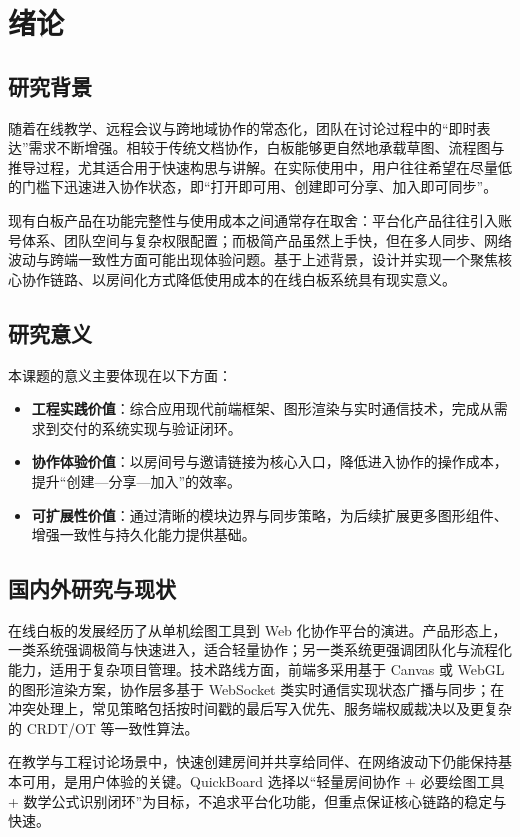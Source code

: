 \chapter{绪论}\label{chap:introduction}

\section{研究背景}
随着在线教学、远程会议与跨地域协作的常态化，团队在讨论过程中的“即时表达”需求不断增强。相较于传统文档协作，白板能够更自然地承载草图、流程图与推导过程，尤其适合用于快速构思与讲解。在实际使用中，用户往往希望在尽量低的门槛下迅速进入协作状态，即“打开即可用、创建即可分享、加入即可同步”。

现有白板产品在功能完整性与使用成本之间通常存在取舍：平台化产品往往引入账号体系、团队空间与复杂权限配置；而极简产品虽然上手快，但在多人同步、网络波动与跨端一致性方面可能出现体验问题。基于上述背景，设计并实现一个聚焦核心协作链路、以房间化方式降低使用成本的在线白板系统具有现实意义。

\section{研究意义}
本课题的意义主要体现在以下方面：
\begin{itemize}
  \item \textbf{工程实践价值}：综合应用现代前端框架、图形渲染与实时通信技术，完成从需求到交付的系统实现与验证闭环。
  \item \textbf{协作体验价值}：以房间号与邀请链接为核心入口，降低进入协作的操作成本，提升“创建—分享—加入”的效率。
  \item \textbf{可扩展性价值}：通过清晰的模块边界与同步策略，为后续扩展更多图形组件、增强一致性与持久化能力提供基础。
\end{itemize}

\section{国内外研究与现状}
在线白板的发展经历了从单机绘图工具到 Web 化协作平台的演进。产品形态上，一类系统强调极简与快速进入，适合轻量协作；另一类系统更强调团队化与流程化能力，适用于复杂项目管理。技术路线方面，前端多采用基于 Canvas 或 WebGL 的图形渲染方案，协作层多基于 WebSocket 类实时通信实现状态广播与同步；在冲突处理上，常见策略包括按时间戳的最后写入优先、服务端权威裁决以及更复杂的 CRDT/OT 等一致性算法。

在教学与工程讨论场景中，快速创建房间并共享给同伴、在网络波动下仍能保持基本可用，是用户体验的关键。QuickBoard 选择以“轻量房间协作 + 必要绘图工具 + 数学公式识别闭环”为目标，不追求平台化功能，但重点保证核心链路的稳定与快速。

